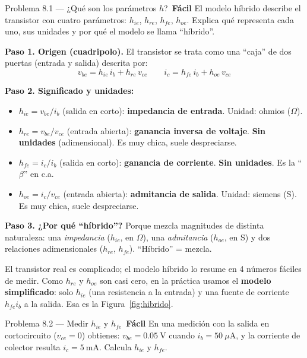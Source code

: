 \documentclass[11pt,a4paper]{article}
\newcommand{\facil}{\textcolor{verdeSignal}{\faIcon{circle}\,\textbf{Fácil}}}
\begin{document}
\begin{problemaBox}{Problema 8.1 --- ¿Qué son los parámetros $h$? \quad \facil}
El modelo híbrido describe el transistor con cuatro parámetros: $h_{ie}$, $h_{re}$, $h_{fe}$, $h_{oe}$. Explica qué representa cada uno, sus unidades y por qué el modelo se llama ``híbrido''.
\end{problemaBox}

\begin{solucionBox}
\textbf{Paso 1. Origen (cuadripolo).} El transistor se trata como una ``caja'' de dos puertas (entrada y salida) descrita por:
\[
v_{be}=h_{ie}\,i_b+h_{re}\,v_{ce}\qquad i_c=h_{fe}\,i_b+h_{oe}\,v_{ce}
\]

\textbf{Paso 2. Significado y unidades:}
\begin{itemize}[leftmargin=1.3em,itemsep=1pt]
  \item $h_{ie}=v_{be}/i_b$ (salida en corto): \textbf{impedancia de entrada}. Unidad: ohmios ($\Omega$).
  \item $h_{re}=v_{be}/v_{ce}$ (entrada abierta): \textbf{ganancia inversa de voltaje}. \textbf{Sin unidades} (adimensional). Es muy chica, suele despreciarse.
  \item $h_{fe}=i_c/i_b$ (salida en corto): \textbf{ganancia de corriente}. \textbf{Sin unidades}. Es la ``$\beta$'' en c.a.
  \item $h_{oe}=i_c/v_{ce}$ (entrada abierta): \textbf{admitancia de salida}. Unidad: siemens (S). Es muy chica, suele despreciarse.
\end{itemize}

\textbf{Paso 3. ¿Por qué ``híbrido''?} Porque mezcla magnitudes de distinta naturaleza: una \emph{impedancia} ($h_{ie}$, en $\Omega$), una \emph{admitancia} ($h_{oe}$, en S) y dos relaciones adimensionales ($h_{re}$, $h_{fe}$). ``Híbrido'' = mezcla.
\end{solucionBox}

\begin{porqueBox}
El transistor real es complicado; el modelo híbrido lo resume en 4 números fáciles de medir. Como $h_{re}$ y $h_{oe}$ son casi cero, en la práctica usamos el \textbf{modelo simplificado}: solo $h_{ie}$ (una resistencia a la entrada) y una fuente de corriente $h_{fe}i_b$ a la salida. Esa es la Figura~\ref{fig:hibrido}.
\end{porqueBox}

\begin{problemaBox}{Problema 8.2 --- Medir $h_{ie}$ y $h_{fe}$ \quad \facil}
En una medición con la salida en cortocircuito ($v_{ce}=0$) obtienes: $v_{be}=0.05\ \text{V}$ cuando $i_b=50\ \mu\text{A}$, y la corriente de colector resulta $i_c=5\ \text{mA}$. Calcula $h_{ie}$ y $h_{fe}$.
\end{problemaBox}
\end{document}
